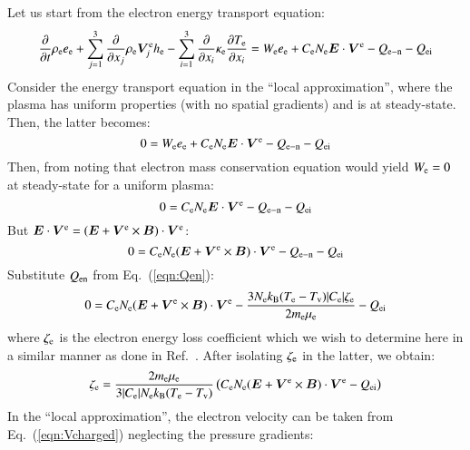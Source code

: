 \documentclass{warpdoc}
\renewcommand{\vec}[1]{\bm{#1}}
\begin{document}
Let us start from the electron energy transport equation:
%
\begin{equation}
\frac{\partial }{\partial t}\rho_{\rm e} e_{\rm e} + \sum_{j=1}^3  \frac{\partial }{\partial x_j} \rho_{\rm e} \vec{V}^{\rm e}_j h_{\rm e} 
-\sum_{i=1}^{3}\frac{\partial }{\partial x_i}\kappa_{\rm e}\frac{\partial T_{\rm e}}{\partial x_i}
= 
 W_{\rm e} e_{\rm e}
+   C_{\rm e} N_{\rm e} \vec{E} \cdot \vec{V}^{\rm e}  
- Q_{\rm e-n}
- Q_{\rm ei}
\end{equation}
%
Consider the energy transport equation in the ``local approximation'', where the plasma has uniform properties (with no spatial gradients) and is at steady-state. Then, the latter becomes:
%
\begin{equation}
0
= 
 W_{\rm e} e_{\rm e}
+   C_{\rm e} N_{\rm e} \vec{E} \cdot \vec{V}^{\rm e}  
- Q_{\rm e-n}
- Q_{\rm ei}
\end{equation}
%
Then, from noting that electron mass conservation equation would yield $W_{\rm e}=0$ at steady-state for a uniform plasma:
%
\begin{equation}
0
= 
   C_{\rm e} N_{\rm e} \vec{E} \cdot \vec{V}^{\rm e}  
- Q_{\rm e-n}
- Q_{\rm ei}
\end{equation}
%
But $\vec{E} \cdot \vec{V}^{\rm e}=(\vec{E}+\vec{V}^{\rm e}\times\vec{B}) \cdot \vec{V}^{\rm e}$:
%
\begin{equation}
0
= 
   C_{\rm e} N_{\rm e} (\vec{E}+\vec{V}^{\rm e}\times\vec{B}) \cdot \vec{V}^{\rm e}  
- Q_{\rm e-n}
- Q_{\rm ei}
\end{equation}
%
Substitute $Q_{\rm en}$ from Eq.\ (\ref{eqn:Qen}):
%
\begin{equation}
0
= 
   C_{\rm e} N_{\rm e} (\vec{E}+\vec{V}^{\rm e}\times\vec{B}) \cdot \vec{V}^{\rm e}  
- \frac{3 N_{\rm e}k_{\rm B} (T_{\rm e}-T_{\rm v})  |C_{\rm e}| \zeta_{\rm e}}{2 m_{\rm e}\mu_{\rm e}}
- Q_{\rm ei}
\end{equation}
%
where  $\zeta_{\rm e}$ is the electron energy loss coefficient which we wish to determine here in a similar manner as done in Ref.\ \cite{misc:1995:boeuf}. After isolating $\zeta_{\rm e}$ in the latter, we obtain:
%
\begin{equation}
  \zeta_{\rm e}   
=  
 \frac{2 m_{\rm e} \mu_{\rm e}}{3 |C_{\rm e}| N_{\rm e} k_{\rm B} (T_{\rm e}-T_{\rm v}) }
\left(  C_{\rm e} N_{\rm e} (\vec{E}+\vec{V}^{\rm e}\times\vec{B}) \cdot \vec{V}^{\rm e}
 - Q_{\rm ei}\right)
\label{eqn:zetae}
 \end{equation}
%
In the ``local approximation'',  the electron velocity can be taken from Eq.\ (\ref{eqn:Vcharged}) neglecting the pressure gradients:
\end{document}
